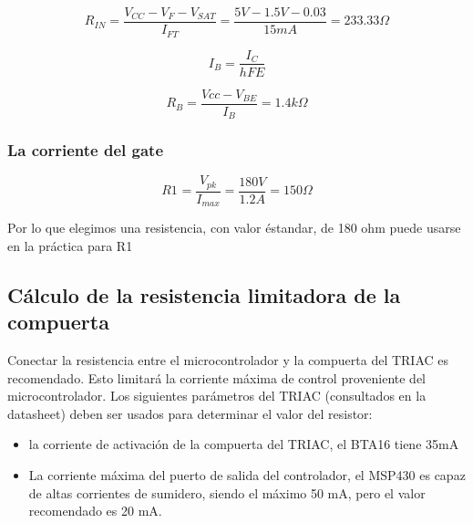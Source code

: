     \begin{equation}
        R_{IN} 
        =   \frac { V_{CC} - V_{F} - V_{SAT} } { I_{FT} }
        =   \frac { 5V - 1.5V - 0.03 } { 15mA }
        =   233.33\Omega
    \end{equation}
    
    \begin{equation}
        I_{B}   =   \frac { I_{C} } { hFE }
    \end{equation}
    
    \begin{equation}
        R_{B}   =   \frac { Vcc - V_{BE} } { I_{B} }    =   1.4k\Omega
    \end{equation}
    
    \subsubsection*{La corriente del gate}
        \begin{equation}
            R1_{ }   =   \frac { V_{pk} } { I_{max} }    =   \frac { 180V } { 1.2A } = 150\Omega
        \end{equation}
        
        Por lo que elegimos una resistencia, con valor éstandar, de 180 ohm puede usarse en la práctica para R1

\subsection{Cálculo de la resistencia limitadora de la compuerta}
    Conectar la resistencia entre el microcontrolador y la compuerta del TRIAC es recomendado. Esto limitará la corriente máxima de control proveniente del microcontrolador. Los siguientes parámetros del TRIAC (consultados en la datasheet) deben ser usados para determinar el valor del resistor:\\

    \begin{itemize}
        \item {
            \setlength{\parskip}{-1mm}
            la corriente de activación de la compuerta del TRIAC, el BTA16 tiene 35mA
            }
        \item {
            \setlength{\parskip}{-1mm}
            La corriente máxima del puerto de salida del controlador, el MSP430 es capaz de altas corrientes de sumidero, siendo el máximo 50 mA, pero el valor recomendado es 20 mA.
            }
    \end{itemize}

